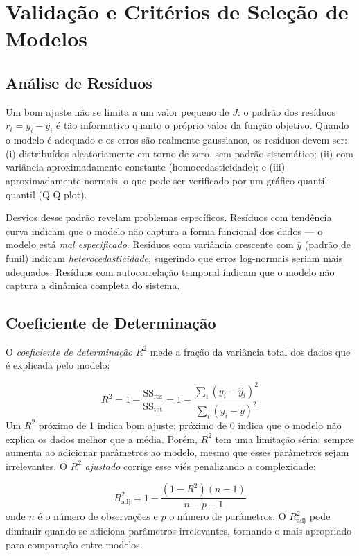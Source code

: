 \section{Validação e Critérios de Seleção de Modelos}

\subsection{Análise de Resíduos}

Um bom ajuste não se limita a um valor pequeno de $J$: o padrão dos resíduos
$r_i = y_i - \hat{y}_i$ é tão informativo quanto o próprio valor da função objetivo.
Quando o modelo é adequado e os erros são realmente gaussianos, os resíduos devem ser:
(i) distribuídos aleatoriamente em torno de zero, sem padrão sistemático; (ii) com
variância aproximadamente constante (homocedasticidade); e (iii) aproximadamente normais,
o que pode ser verificado por um gráfico quantil-quantil (Q-Q plot).

Desvios desse padrão revelam problemas específicos. Resíduos com tendência curva indicam
que o modelo não captura a forma funcional dos dados --- o modelo está \emph{mal
especificado}. Resíduos com variância crescente com $\hat{y}$ (padrão de funil) indicam
\emph{heterocedasticidade}, sugerindo que erros log-normais seriam mais adequados.
Resíduos com autocorrelação temporal indicam que o modelo não captura a dinâmica
completa do sistema.

\subsection{Coeficiente de Determinação}

O \emph{coeficiente de determinação} $R^2$ mede a fração da variância total dos dados
que é explicada pelo modelo:

\begin{equation}
R^2 = 1 - \frac{\text{SS}_\text{res}}{\text{SS}_\text{tot}} = 1 - \frac{\sum_i (y_i - \hat{y}_i)^2}{\sum_i (y_i - \bar{y})^2}
\end{equation}
Um $R^2$ próximo de 1 indica bom ajuste; próximo de 0 indica que o modelo não explica
os dados melhor que a média. Porém, $R^2$ tem uma limitação séria: sempre aumenta ao
adicionar parâmetros ao modelo, mesmo que esses parâmetros sejam irrelevantes. O
$R^2$ \emph{ajustado} corrige esse viés penalizando a complexidade:

\begin{equation}
R^2_\text{adj} = 1 - \frac{(1-R^2)(n-1)}{n-p-1}
\end{equation}
onde $n$ é o número de observações e $p$ o número de parâmetros. O $R^2_\text{adj}$
pode diminuir quando se adiciona parâmetros irrelevantes, tornando-o mais apropriado
para comparação entre modelos.

